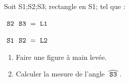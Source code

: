 \documentclass[exercice]{thedocument}%
\begin{document}
%
Soit \<S1;\<S2;\<S3; rectangle en \<S1; tel que :\par\smallskip
\hskip20pt$\text{\<S2;\<S3;}=\text{\<L1;}$\par\smallskip
\hskip20pt$\text{\<S1;\<S2;}=\text{\<L2;}$\par\bigskip
\begin{enumerate}
    \item Faire une figure à main levée.
    \item Calculer la mesure de l'angle $\widehat{\text{\<S3;}}$.
\end{enumerate}
\end{document}
